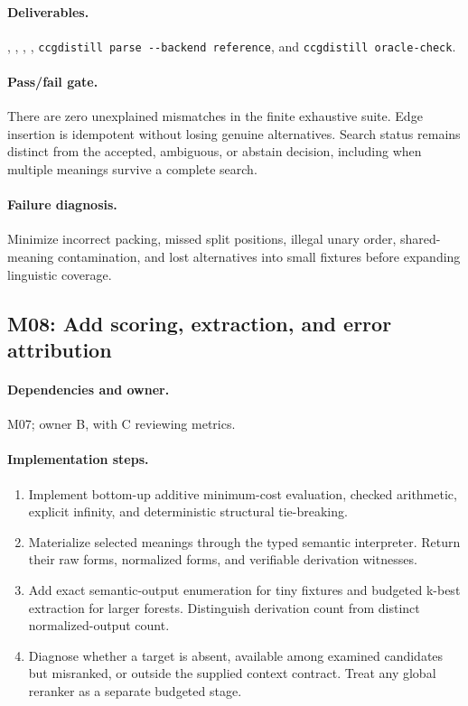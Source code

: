 \documentclass[11pt,a4paper]{article}
\begin{document}
\paragraph{Deliverables.} , , , , \texttt{ccgdistill parse -{}-backend reference}, and \texttt{ccgdistill oracle-check}.

\paragraph{Pass/fail gate.} There are zero unexplained mismatches in the finite exhaustive suite. Edge insertion is idempotent without losing genuine alternatives. Search status remains distinct from the accepted, ambiguous, or abstain decision, including when multiple meanings survive a complete search.

\paragraph{Failure diagnosis.} Minimize incorrect packing, missed split positions, illegal unary order, shared-meaning contamination, and lost alternatives into small fixtures before expanding linguistic coverage.

\subsection{M08: Add scoring, extraction, and error attribution}

\paragraph{Dependencies and owner.} M07; owner B, with C reviewing metrics.

\paragraph{Implementation steps.}
\begin{enumerate}
\item Implement bottom-up additive minimum-cost evaluation, checked arithmetic, explicit infinity, and deterministic structural tie-breaking.
\item Materialize selected meanings through the typed semantic interpreter. Return their raw forms, normalized forms, and verifiable derivation witnesses.
\item Add exact semantic-output enumeration for tiny fixtures and budgeted k-best extraction for larger forests. Distinguish derivation count from distinct normalized-output count.
\item Diagnose whether a target is absent, available among examined candidates but misranked, or outside the supplied context contract. Treat any global reranker as a separate budgeted stage.
\end{enumerate}
\end{document}
